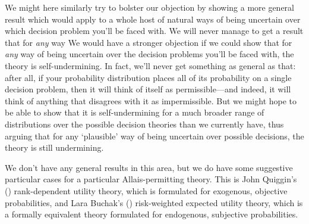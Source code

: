 \documentclass[a4paper]{article}
\renewcommand{\color}[1]{}
\newenvironment{CCM rewritten}
{\begingroup\color{blue}} %
{\endgroup}              %
\begin{document}
%

We might here similarly try to bolster our objection by showing a more general result which would apply to a whole host of natural ways of being uncertain over which decision problem you'll be faced with. 
We will never manage to get a result that for \emph{any} way 
We would have a stronger objection if we could show that for \textit{any} way of being uncertain over the decision problems you'll be faced with, the theory is self-undermining. In fact, we'll never get something as general as that: after all, if your probability distribution places all of its probability on a single decision problem, then it will think of itself as permissible---and indeed, it will think of anything that disagrees with it as impermissible. But we might hope to be able to show that it is self-undermining for a much broader range of distributions over the possible decision theories than we currently have, thus arguing that for any `plausible' way of being uncertain over possible decisions, the theory is still undermining. 


We don't have any general results in this area, but we do have some suggestive particular cases for a particular Allais-permitting theory. This is John Quiggin's (\citeyear{quiggin1982tau,quiggin1993geut}) rank-dependent utility theory, which is formulated for exogenous, objective probabilities, and Lara Buchak's (\citeyear{buchak2014rr}) risk-weighted expected utility theory, which is a formally equivalent theory formulated for endogenous, subjective probabilities.
\end{document}
